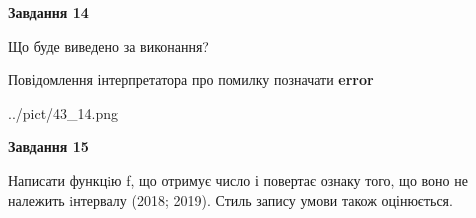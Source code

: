 \documentclass[11pt, ukrainian]{article}
\begin{document}
{\begin {large}
{\begin {center}\textbf{Завдання 14}\end {center}}\par
Що буде виведено за виконання? \par
Повідомлення інтерпретатора про помилку позначати \textbf{error}

\begin{center}
	{../pict/43_14.png}
\end{center}
\newpage

{\begin {center}\textbf{Завдання 15}\end {center}}\par

Написати функцiю f, що отримує число і повертає ознаку того, що воно не належить iнтервалу (2018; 2019). Стиль запису умови також оцінюється.\par
\newpage

\end {large}}
\end{document}
